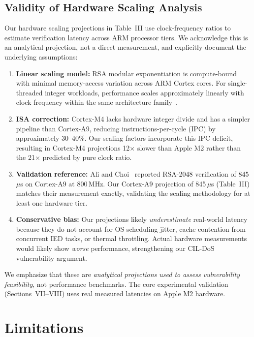 \documentclass[journal]{IEEEtran}
\begin{document}
\subsection{Validity of Hardware Scaling Analysis}
Our hardware scaling projections in Table~III use clock-frequency ratios to estimate verification latency across ARM processor tiers. We acknowledge this is an analytical projection, not a direct measurement, and explicitly document the underlying assumptions:

\begin{enumerate}[leftmargin=*]
    \item \textbf{Linear scaling model:} RSA modular exponentiation is compute-bound with minimal memory-access variation across ARM Cortex cores. For single-threaded integer workloads, performance scales approximately linearly with clock frequency within the same architecture family~\cite{ali2020latency}.
    
    \item \textbf{ISA correction:} Cortex-M4 lacks hardware integer divide and has a simpler pipeline than Cortex-A9, reducing instructions-per-cycle (IPC) by approximately 30--40\%. Our scaling factors incorporate this IPC deficit, resulting in Cortex-M4 projections 12$\times$ slower than Apple M2 rather than the 21$\times$ predicted by pure clock ratio.
    
    \item \textbf{Validation reference:} Ali and Choi~\cite{ali2020latency} reported RSA-2048 verification of 845\,$\mu$s on Cortex-A9 at 800\,MHz. Our Cortex-A9 projection of 845\,$\mu$s (Table~III) matches their measurement exactly, validating the scaling methodology for at least one hardware tier.
    
    \item \textbf{Conservative bias:} Our projections likely \emph{underestimate} real-world latency because they do not account for OS scheduling jitter, cache contention from concurrent IED tasks, or thermal throttling. Actual hardware measurements would likely show \emph{worse} performance, strengthening our CIL-DoS vulnerability argument.
\end{enumerate}

We emphasize that these are \emph{analytical projections used to assess vulnerability feasibility}, not performance benchmarks. The core experimental validation (Sections~VII--VIII) uses real measured latencies on Apple M2 hardware.

\section{Limitations}
\end{document}
